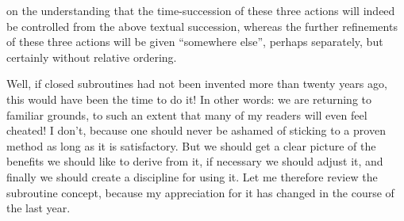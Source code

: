 \noindent
on the understanding that the time-succession of these three actions will indeed be controlled from the above textual succession, whereas the further refinements of these three actions will be given ``somewhere else'', perhaps separately, but certainly without relative ordering.

Well, if closed subroutines had not been invented more than twenty years ago, this would have been the time to do it! In other words: we are returning to familiar grounds, to such an extent that many of my readers will even feel cheated! I don't, because one should never be ashamed of sticking to a proven method as long as it is satisfactory. But we should get a clear picture of the benefits we should like to derive from it, if necessary we should adjust it, and finally we should create a discipline for using it. Let me therefore review the subroutine concept, because my appreciation for it has changed in the course of the last year.

